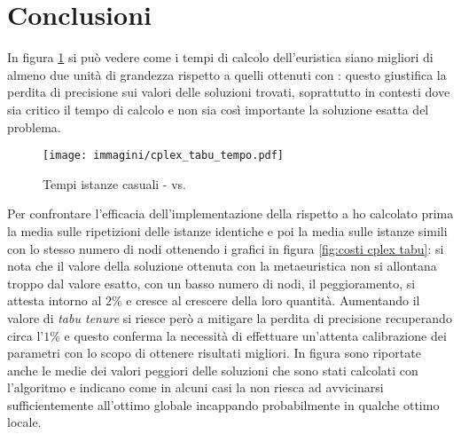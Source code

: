 \section{Conclusioni}

In figura \ref{fig:tempi cplex tabu} si può vedere come i tempi di calcolo dell'euristica \tabu siano migliori di almeno due unità di grandezza rispetto a quelli ottenuti con : questo giustifica la perdita di precisione sui valori delle soluzioni trovati, soprattutto in contesti dove sia critico il tempo di calcolo e non sia così importante la soluzione esatta del problema.

\begin{figure}[htb]
	\centering
	\texttt{[image: immagini/cplex\_tabu\_tempo.pdf]}
	\caption{Tempi istanze casuali -  vs. \tabu}
	\label{fig:tempi cplex tabu}
\end{figure}

Per confrontare l'efficacia dell'implementazione della \tabu rispetto a  ho calcolato prima la media sulle ripetizioni delle istanze identiche e poi la media sulle istanze simili con lo stesso numero di nodi ottenendo i grafici in figura \ref{fig:costi cplex tabu}: si nota che il valore della soluzione ottenuta con la metaeuristica non si allontana troppo dal valore esatto, con un basso numero di nodi, il peggioramento, si attesta intorno al $2\%$ e cresce al crescere della loro quantità.
Aumentando il valore di \emph{tabu tenure} si riesce però a mitigare la perdita di precisione recuperando circa l'$1\%$ e questo conferma la necessità di effettuare un'attenta calibrazione dei parametri con lo scopo di ottenere risultati migliori.
In figura sono riportate anche le medie dei valori peggiori delle soluzioni che sono stati calcolati con l'algoritmo e indicano come in alcuni casi la \tabu non riesca ad avvicinarsi sufficientemente all'ottimo globale incappando probabilmente in qualche ottimo locale.

